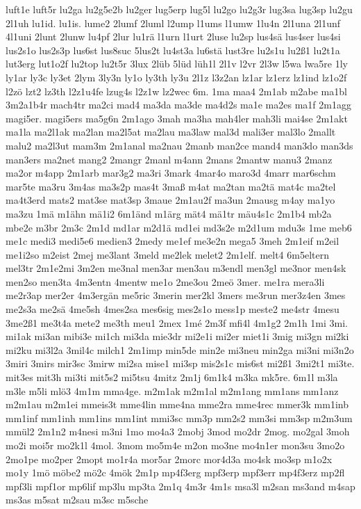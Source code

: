 {luft1e
luft5r
lu2ga
lu2g5e2b
lu2ger
lug5erp
lug5l
lu2go
lu2g3r
lug3sa
lug3sp
lu2gu
2l1uh
lu1id.
lu1is.
lume2
2lumf
2luml
l2ump
l1ums
l1umw
1lu4n
2l1una
2l1unf
4l1uni
2lunt
2lunw
lu4pf
2lur
lu1rä
l1urn
l1urt
2luse
lu2sp
lus4sä
lus4ser
lus4si
lus2s1o
lus2s3p
lus6st
lus8suc
5lus2t
lu4st3a
lu6stä
lust3re
lu2s1u
lu2ß1
lu2t1a
lut3erg
lut1o2f
lu2top
lu2t5r
3lux
2lüb
5lüd
lüh1l
2l1v
l2vr
2l3w
l5wa
lwa5re
1ly
ly1ar
ly3c
ly3et
2lym
3ly3n
ly1o
ly3th
ly3u
2l1z
l3z2an
lz1ar
lz1erz
lz1ind
lz1o2f
l2zö
lzt2
lz3th
l2z1u4fe
lzug4s
l2z1w
lz2wec
6m.
1ma
maa4
2m1ab
m2abe
ma1bl
3m2a1b4r
mach4tr
ma2ci
mad4
ma3da
ma3de
ma4d2s
ma1e
ma2es
ma1f
2m1agg
magi5er.
magi5ers
ma5g6n
2m1ago
3mah
ma3ha
mah4ler
mah3li
mai4se
2m1akt
ma1la
ma2l1ak
ma2lan
ma2l5at
ma2lau
ma3law
mal3d
mali3er
mal3lo
2mallt
malu2
ma2l3ut
mam3m
2m1anal
ma2nau
2manb
man2ce
mand4
man3do
man3ds
man3ers
ma2net
mang2
2mangr
2manl
m4ann
2mans
2mantw
manu3
2manz
ma2or
m4app
2m1arb
mar3g2
ma3ri
3mark
4mar4o
maro3d
4marr
mar6schm
mar5te
ma3ru
3m4as
ma3s2p
mas4t
3maß
m4at
ma2tan
ma2tä
mat4c
ma2tel
ma4t3erd
mats2
mat3se
mat3sp
3maue
2m1au2f
ma3un
2mausg
m4ay
ma1yo
ma3zu
1mä
m1ähn
mä1i2
6m1änd
m1ärg
mät4
mä1tr
mäu4s1c
2m1b4
mb2a
mbe2e
m3br
2m3c
2m1d
md1ar
m2d1ä
md1ei
md3s2e
m2d1um
mdu3s
1me
meb6
me1c
medi3
medi5e6
medien3
2medy
me1ef
me3e2n
mega5
3meh
2m1eif
m2eil
me1i2so
m2eist
2mej
me3lant
3meld
me2lek
melet2
2m1elf.
melt4
6m5eltern
mel3tr
2m1e2mi
3m2en
me3nal
men3ar
men3au
m3endl
men3gl
me3nor
men4sk
men2so
men3ta
4m3entn
4mentw
me1o
2me3ou
2meö
3mer.
me1ra
mera3li
me2r3ap
mer2er
4m3ergän
me5ric
3merin
mer2kl
3mers
me3run
mer3z4en
3mes
me2s3a
me2sä
4me5sh
4mes2sa
mes6sig
mes2s1o
mess1p
meste2
me4str
4mesu
3me2ß1
me3t4a
mete2
me3th
meu1
2mex
1mé
2m3f
mfi4l
4m1g2
2m1h
1mi
3mi.
mi1ak
mi3an
mibi3e
mi1ch
mi3da
mie3dr
mi2e1i
mi2er
miet1i
3mig
mi3gn
mi2ki
mi2ku
mi3l2a
3mil4c
milch1
2m1imp
min5de
min2e
mi3neu
min2ga
mi3ni
mi3n2o
3miri
3mirs
mir3sc
3mirw
mi2sa
mise1
mi3sp
mis2s1c
mis6st
mi2ß1
3mi2t1
mi3te.
mit3es
mit3h
mi3ti
mit5s2
mi5tsu
4mitz
2m1j
6m1k4
m3ka
mk5re.
6m1l
m3la
m3le
m5li
mlö3
4m1m
mma4ge.
m2m1ak
m2m1al
m2m1ang
mm1ans
mm1anz
m2m1au
m2m1ei
mmeis3t
mme4lin
mme4na
mme2ra
mme4rec
mmer3k
mm1inb
mm1inf
mm1inh
mm1ins
mm1int
mmi3sc
mm3p
mm2s2
mm3si
mm3sp
m2m3um
mmül2
2m1n2
m4nesi
m3ni
1mo
mo4a3
2mobj
3mod
mo2dr
2mog.
mo2gal
3moh
mo2i
moi5r
mo2k1l
4mol.
3mom
mo5m4e
m2on
mo3ne
mo4n1er
mon3su
3mo2o
2mo1pe
mo2per
2mopt
mo1r4a
mor5ar
2morc
mor4d3a
mo4sk
mo3sp
m1o2x
mo1y
1mö
möbe2
mö2c
4mök
2m1p
mp4f3erg
mpf3erp
mpf3err
mp4f3erz
mp2fl
mpf3li
mpf1or
mp6lif
mp3lu
mp3ta
2m1q
4m3r
4m1s
msa3l
m2san
ms3and
m4sap
ms3as
m5sat
m2sau
m3sc
m5sche
}
